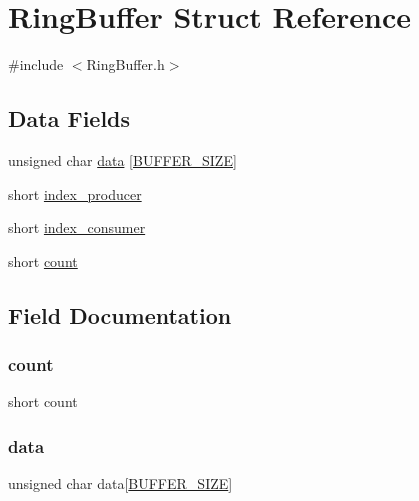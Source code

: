 \hypertarget{struct_ring_buffer}{}\section{Ring\+Buffer Struct Reference}
\label{struct_ring_buffer}


{\ttfamily \#include $<$Ring\+Buffer.\+h$>$}

\subsection*{Data Fields}
\begin{DoxyCompactItemize}
\item 
unsigned char \hyperlink{struct_ring_buffer_a8935a881a4cb444d4a780af4f50699e2}{data} \mbox{[}\hyperlink{_ring_buffer_8h_a6b20d41d6252e9871430c242cb1a56e7}{B\+U\+F\+F\+E\+R\+\_\+\+S\+I\+ZE}\mbox{]}
\item 
short \hyperlink{struct_ring_buffer_a839c034ce849f0cd6b5da2440e751a0f}{index\+\_\+producer}
\item 
short \hyperlink{struct_ring_buffer_a4d4eb51c429e7c5750fce746dce85d0a}{index\+\_\+consumer}
\item 
short \hyperlink{struct_ring_buffer_ab1239367c3401b34e2b1d9279cd1a985}{count}
\end{DoxyCompactItemize}


\subsection{Field Documentation}
\mbox{\label{struct_ring_buffer_ab1239367c3401b34e2b1d9279cd1a985}} 
\subsubsection{\texorpdfstring{count}{count}}
{\footnotesize\ttfamily short count}

\mbox{\label{struct_ring_buffer_a8935a881a4cb444d4a780af4f50699e2}} 
\subsubsection{\texorpdfstring{data}{data}}
{\footnotesize\ttfamily unsigned char data\mbox{[}\hyperlink{_ring_buffer_8h_a6b20d41d6252e9871430c242cb1a56e7}{B\+U\+F\+F\+E\+R\+\_\+\+S\+I\+ZE}\mbox{]}}

